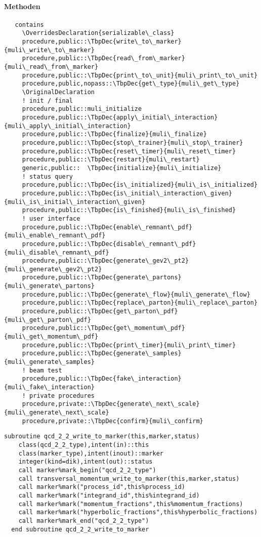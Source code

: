 \paragraph{Methoden}
\begin{Verbatim}
   contains
     \OverridesDeclaration{serializable\_class}
     procedure,public::\TbpDec{write\_to\_marker}{muli\_write\_to\_marker}
     procedure,public::\TbpDec{read\_from\_marker}{muli\_read\_from\_marker}
     procedure,public::\TbpDec{print\_to\_unit}{muli\_print\_to\_unit}
     procedure,public,nopass::\TbpDec{get\_type}{muli\_get\_type}
     \OriginalDeclaration
     ! init / final
     procedure,public::muli_initialize
     procedure,public::\TbpDec{apply\_initial\_interaction}{muli\_apply\_initial\_interaction}
     procedure,public::\TbpDec{finalize}{muli\_finalize}
     procedure,public::\TbpDec{stop\_trainer}{muli\_stop\_trainer}
     procedure,public::\TbpDec{reset\_timer}{muli\_reset\_timer}
     procedure,public::\TbpDec{restart}{muli\_restart}
     generic,public::  \TbpDec{initialize}{muli\_initialize}
     ! status query
     procedure,public::\TbpDec{is\_initialized}{muli\_is\_initialized}
     procedure,public::\TbpDec{is\_initial\_interaction\_given}{muli\_is\_initial\_interaction\_given}
     procedure,public::\TbpDec{is\_finished}{muli\_is\_finished}
     ! user interface
     procedure,public::\TbpDec{enable\_remnant\_pdf}{muli\_enable\_remnant\_pdf}
     procedure,public::\TbpDec{disable\_remnant\_pdf}{muli\_disable\_remnant\_pdf}
     procedure,public::\TbpDec{generate\_gev2\_pt2}{muli\_generate\_gev2\_pt2}
     procedure,public::\TbpDec{generate\_partons}{muli\_generate\_partons}
     procedure,public::\TbpDec{generate\_flow}{muli\_generate\_flow}
     procedure,public::\TbpDec{replace\_parton}{muli\_replace\_parton}
     procedure,public::\TbpDec{get\_parton\_pdf}{muli\_get\_parton\_pdf}
     procedure,public::\TbpDec{get\_momentum\_pdf}{muli\_get\_momentum\_pdf}
     procedure,public::\TbpDec{print\_timer}{muli\_print\_timer}
     procedure,public::\TbpDec{generate\_samples}{muli\_generate\_samples}
     ! beam test
     procedure,public::\TbpDec{fake\_interaction}{muli\_fake\_interaction}
     ! private procedures
     procedure,private::\TbpDec{generate\_next\_scale}{muli\_generate\_next\_scale}
     procedure,private::\TbpDec{confirm}{muli\_confirm}
   \end{Verbatim}
\Methods
{}
\begin{Verbatim}
subroutine qcd_2_2_write_to_marker(this,marker,status)
    class(qcd_2_2_type),intent(in)::this
    class(marker_type),intent(inout)::marker
    integer(kind=dik),intent(out)::status
    call marker%mark_begin("qcd_2_2_type")
    call transversal_momentum_write_to_marker(this,marker,status)
    call marker%mark("process_id",this%process_id)
    call marker%mark("integrand_id",this%integrand_id)
    call marker%mark("momentum_fractions",this%momentum_fractions)
    call marker%mark("hyperbolic_fractions",this%hyperbolic_fractions)
    call marker%mark_end("qcd_2_2_type")
  end subroutine qcd_2_2_write_to_marker
\end{Verbatim}

